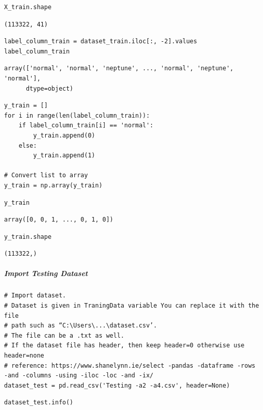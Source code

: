 \begin{verbatim}
X_train.shape
\end{verbatim}

\begin{verbatim}
(113322, 41)
\end{verbatim}

\begin{verbatim}
label_column_train = dataset_train.iloc[:, -2].values
label_column_train
\end{verbatim}

\begin{verbatim}
array(['normal', 'normal', 'neptune', ..., 'normal', 'neptune', 'normal'],
      dtype=object)
\end{verbatim}

\begin{verbatim}
y_train = []
for i in range(len(label_column_train)):
    if label_column_train[i] == 'normal':
        y_train.append(0)
    else:
        y_train.append(1)

# Convert list to array
y_train = np.array(y_train)
\end{verbatim}

\begin{verbatim}
y_train
\end{verbatim}

\begin{verbatim}
array([0, 0, 1, ..., 0, 1, 0])
\end{verbatim}

\begin{verbatim}
y_train.shape
\end{verbatim}

\begin{verbatim}
(113322,)
\end{verbatim}

\subparagraph{Import Testing Dataset}

\begin{verbatim}
# Import dataset.
# Dataset is given in TraningData variable You can replace it with the file 
# path such as “C:\Users\...\dataset.csv’. 
# The file can be a .txt as well. 
# If the dataset file has header, then keep header=0 otherwise use header=none
# reference: https://www.shanelynn.ie/select -pandas -dataframe -rows -and -columns -using -iloc -loc -and -ix/
dataset_test = pd.read_csv('Testing -a2 -a4.csv', header=None)
\end{verbatim}

\begin{verbatim}
dataset_test.info()
\end{verbatim}

